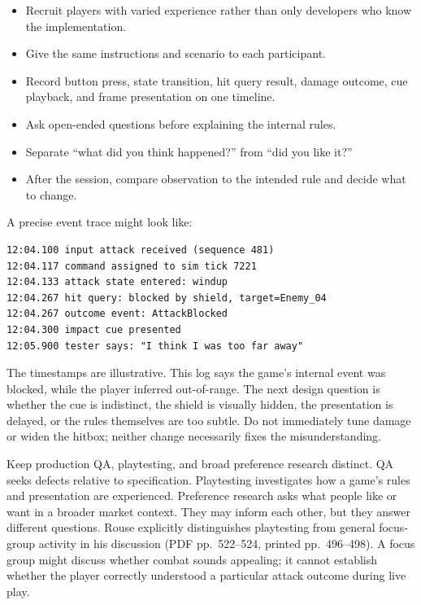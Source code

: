\begin{itemize}
\tightlist
\item
  Recruit players with varied experience rather than only developers who know the implementation.
\item
  Give the same instructions and scenario to each participant.
\item
  Record button press, state transition, hit query result, damage outcome, cue playback, and frame presentation on one timeline.
\item
  Ask open-ended questions before explaining the internal rules.
\item
  Separate ``what did you think happened?'' from ``did you like it?''
\item
  After the session, compare observation to the intended rule and decide what to change.
\end{itemize}

A precise event trace might look like:

\begin{verbatim}
12:04.100 input attack received (sequence 481)
12:04.117 command assigned to sim tick 7221
12:04.133 attack state entered: windup
12:04.267 hit query: blocked by shield, target=Enemy_04
12:04.267 outcome event: AttackBlocked
12:04.300 impact cue presented
12:05.900 tester says: "I think I was too far away"
\end{verbatim}

The timestamps are illustrative. This log says the game's internal event was blocked, while the player inferred out-of-range. The next design question is whether the cue is indistinct, the shield is visually hidden, the presentation is delayed, or the rules themselves are too subtle. Do not immediately tune damage or widen the hitbox; neither change necessarily fixes the misunderstanding.

Keep production QA, playtesting, and broad preference research distinct. QA seeks defects relative to specification. Playtesting investigates how a game's rules and presentation are experienced. Preference research asks what people like or want in a broader market context. They may inform each other, but they answer different questions. Rouse explicitly distinguishes playtesting from general focus-group activity in his discussion (PDF pp.~522--524, printed pp.~496--498). A focus group might discuss whether combat sounds appealing; it cannot establish whether the player correctly understood a particular attack outcome during live play.


